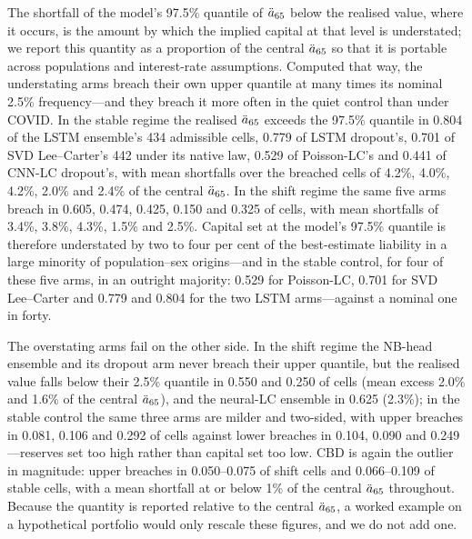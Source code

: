 The shortfall of the model's 97.5\% quantile of $\ddot{a}_{65}$ below the
realised value, where it occurs, is the amount by which the implied capital
at that level is understated; we report this quantity as a proportion of
the central $\ddot{a}_{65}$ so that it is portable across populations and
interest-rate assumptions.
Computed that way, the understating arms breach their own upper quantile at
many times its nominal 2.5\% frequency---and they breach it more often in
the quiet control than under COVID. In the stable regime the realised
$\ddot{a}_{65}$ exceeds the 97.5\% quantile in 0.804 of the LSTM ensemble's 434
admissible cells, 0.779 of LSTM dropout's, 0.701 of SVD Lee--Carter's 442
under its native law, 0.529 of Poisson-LC's and 0.441 of CNN-LC dropout's,
with mean shortfalls over the breached cells of 4.2\%, 4.0\%, 4.2\%, 2.0\%
and 2.4\% of the central $\ddot{a}_{65}$. In the shift regime the same five arms
breach in 0.605, 0.474, 0.425, 0.150 and 0.325 of cells, with mean
shortfalls of 3.4\%, 3.8\%, 4.3\%, 1.5\% and 2.5\%. Capital set at the
model's 97.5\% quantile is therefore understated by two to four per cent of
the best-estimate liability in a large minority of population--sex
origins---and in the stable control, for four of these five arms, in an
outright majority: 0.529 for Poisson-LC, 0.701 for SVD Lee--Carter and
0.779 and 0.804 for the two LSTM arms---against a nominal one in forty.

The overstating arms fail on the other side. In the shift regime the
NB-head ensemble and its dropout arm never breach their upper quantile, but
the realised value falls below their 2.5\% quantile in 0.550 and 0.250 of
cells (mean excess 2.0\% and 1.6\% of the central $\ddot{a}_{65}$), and the
neural-LC ensemble in 0.625 (2.3\%); in the stable control the same three
arms are milder and two-sided, with upper breaches in 0.081, 0.106 and
0.292 of cells against lower breaches in 0.104, 0.090 and 0.249---reserves
set too high rather than capital set too low. CBD is again the outlier in
magnitude: upper breaches in 0.050--0.075 of shift cells and 0.066--0.109
of stable cells, with a mean shortfall at or below 1\% of the central
$\ddot{a}_{65}$ throughout. Because the quantity is reported relative to the
central $\ddot{a}_{65}$, a worked example on a hypothetical portfolio would only
rescale these figures, and we do not add one.

